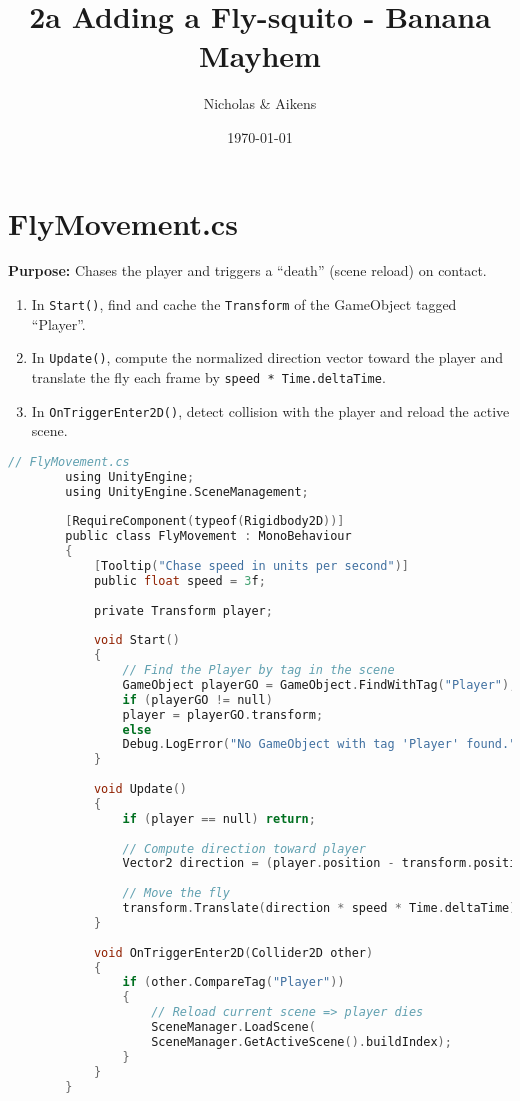 \documentclass[11pt]{article}
\title{2a Adding a Fly-squito - Banana Mayhem}
\author{Nicholas \& Aikens}
\date{\today}
\begin{document}
	\maketitle
	
	\section{FlyMovement.cs}
	
	\textbf{Purpose:} Chases the player and triggers a “death” (scene reload) on contact.
	
	\begin{enumerate}[label=\arabic*.]
		\item In \texttt{Start()}, find and cache the \texttt{Transform} of the GameObject tagged “Player”.  
		\item In \texttt{Update()}, compute the normalized direction vector toward the player and translate the fly each frame by \texttt{speed * Time.deltaTime}.  
		\item In \texttt{OnTriggerEnter2D()}, detect collision with the player and reload the active scene.  
	\end{enumerate}
	
	\begin{lstlisting}[language=C]
		// FlyMovement.cs
		using UnityEngine;
		using UnityEngine.SceneManagement;
		
		[RequireComponent(typeof(Rigidbody2D))]
		public class FlyMovement : MonoBehaviour
		{
			[Tooltip("Chase speed in units per second")]
			public float speed = 3f;
			
			private Transform player;
			
			void Start()
			{
				// Find the Player by tag in the scene
				GameObject playerGO = GameObject.FindWithTag("Player");
				if (playerGO != null)
				player = playerGO.transform;
				else
				Debug.LogError("No GameObject with tag 'Player' found.");
			}
			
			void Update()
			{
				if (player == null) return;
				
				// Compute direction toward player
				Vector2 direction = (player.position - transform.position).normalized;
				
				// Move the fly
				transform.Translate(direction * speed * Time.deltaTime);
			}
			
			void OnTriggerEnter2D(Collider2D other)
			{
				if (other.CompareTag("Player"))
				{
					// Reload current scene => player dies
					SceneManager.LoadScene(
					SceneManager.GetActiveScene().buildIndex);
				}
			}
		}
	\end{lstlisting}
	
\end{document}
